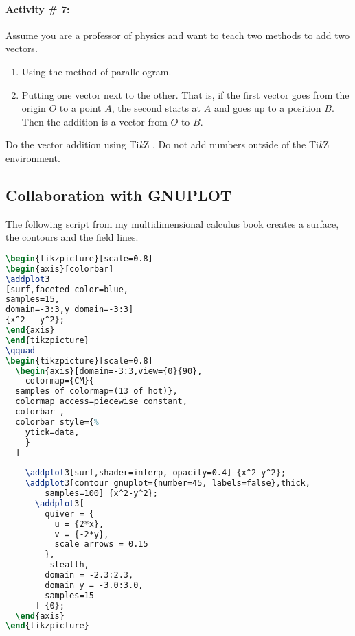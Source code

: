 \documentclass[12pt]{article}
\newcommand{\myTikZ}{Ti\textit{k}Z }
\begin{document}
\paragraph{Activity \# 7:}
Assume you are a professor of physics and want to teach two methods to add two vectors.
\begin{enumerate}
  \item Using the method of parallelogram.
  \item Putting one vector next to the other. That is, if the first vector goes from the origin
    $O$ to a point $A$, the second starts at $A$ and goes up to a position $B$. Then the
    addition is a vector from $O$ to $B$. 
\end{enumerate}
Do the vector addition using \myTikZ . Do not add numbers outside of the \myTikZ environment.


\subsection{Collaboration with GNUPLOT}
The following script from my multidimensional calculus book
creates a surface, the contours and the field lines.

\begin{lstlisting}[language=tex]
\begin{tikzpicture}[scale=0.8]
\begin{axis}[colorbar]
\addplot3
[surf,faceted color=blue,
samples=15,
domain=-3:3,y domain=-3:3]
{x^2 - y^2};
\end{axis}
\end{tikzpicture}
\qquad
\begin{tikzpicture}[scale=0.8]
  \begin{axis}[domain=-3:3,view={0}{90},
    colormap={CM}{
  samples of colormap=(13 of hot)},
  colormap access=piecewise constant,
  colorbar ,
  colorbar style={%
    ytick=data,
    }
  ]
    
    \addplot3[surf,shader=interp, opacity=0.4] {x^2-y^2};
    \addplot3[contour gnuplot={number=45, labels=false},thick, 
        samples=100] {x^2-y^2};
      \addplot3[
        quiver = {
          u = {2*x},
          v = {-2*y},
          scale arrows = 0.15
        },
        -stealth,
        domain = -2.3:2.3,
        domain y = -3.0:3.0,
        samples=15
      ] {0};
  \end{axis}
\end{tikzpicture}
\end{lstlisting}
\end{document}
